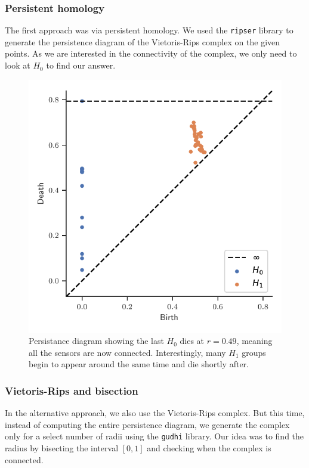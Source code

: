 \documentclass[twocolumn]{article}
\begin{document}
\subsubsection{Persistent homology}
The first approach was via persistent homology. We used the \texttt{ripser} library to generate the persistence diagram of the Vietoris-Rips complex on the given points. As we are interested in the connectivity of the complex, we only need to look at $H_0$ to find our answer.

\begin{figure}[H]
    \centering
    \includegraphics[width=\columnwidth]{fig/persistence}
    \caption{Persistance diagram showing the last $H_0$ dies at $r = 0.49$, meaning all the sensors are now connected. Interestingly, many $H_1$ groups begin to appear around the same time and die shortly after.}
    \label{fig:persistance}
\end{figure}

\subsubsection{Vietoris-Rips and bisection}
In the alternative approach, we also use the Vietoris-Rips complex. But this time, instead of computing the entire persistence diagram, we generate the complex only for a select number of radii using the \texttt{gudhi} library. Our idea was to find the radius by bisecting the interval $[0, 1]$ and checking when the complex is connected. 
\end{document}
